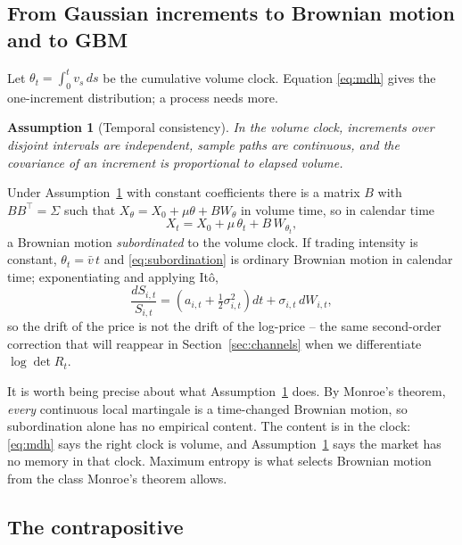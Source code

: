 \documentclass[11pt]{article}
\newtheorem{assumption}{Assumption}
\theoremstyle{definition}
\theoremstyle{remark}
\begin{document}
\subsection{From Gaussian increments to Brownian motion and to GBM}

Let $\theta_t=\int_0^t v_s\,ds$ be the cumulative volume clock. Equation
\eqref{eq:mdh} gives the one-increment distribution; a process needs more.

\begin{assumption}[Temporal consistency]\label{as:time}
In the volume clock, increments over disjoint intervals are independent, sample
paths are continuous, and the covariance of an increment is proportional to
elapsed volume.
\end{assumption}

Under Assumption~\ref{as:time} with constant coefficients there is a matrix $B$
with $BB^{\!\top}=\Sigma$ such that $X_\theta = X_0 + \mu\theta + BW_\theta$ in
volume time, so in calendar time
\begin{equation}
\label{eq:subordination}
X_t = X_0 + \mu\,\theta_t + B\,W_{\theta_t},
\end{equation}
a Brownian motion \emph{subordinated} to the volume clock. If trading intensity
is constant, $\theta_t=\bar v\,t$ and \eqref{eq:subordination} is ordinary
Brownian motion in calendar time; exponentiating and applying Itô,
\begin{equation}
\frac{dS_{i,t}}{S_{i,t}} = \left(a_{i,t}+\tfrac12\sigma_{i,t}^2\right)dt + \sigma_{i,t}\,dW_{i,t},
\end{equation}
so the drift of the price is not the drift of the log-price -- the same
second-order correction that will reappear in Section~\ref{sec:channels} when we
differentiate $\log\det R_t$.

It is worth being precise about what Assumption~\ref{as:time} does. By Monroe's
\citeyearpar{monroe1978} theorem, \emph{every} continuous local martingale is a
time-changed Brownian motion, so subordination alone has no empirical content.
The content is in the clock: \eqref{eq:mdh} says the right clock is volume, and
Assumption~\ref{as:time} says the market has no memory in that clock. Maximum
entropy is what selects Brownian motion from the class Monroe's theorem allows.

\subsection{The contrapositive}
\label{sec:contrapositive}
\end{document}
